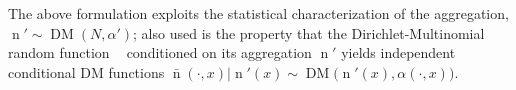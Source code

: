 \documentclass[12pt]{article}
\DeclareMathOperator{\xrm}{\mathrm{x}}
\DeclareMathOperator{\yrm}{\mathrm{y}}
\DeclareMathOperator{\nrm}{\mathrm{n}}
\DeclareMathOperator{\nbarrm}{\bar{\mathrm{n}}}
\DeclareMathOperator{\Prm}{\mathrm{P}}
\DeclareMathOperator{\Erm}{\mathrm{E}}
\DeclareMathOperator{\Xcal}{\mathcal{X}}
\DeclareMathOperator{\Ycal}{\mathcal{Y}}
\DeclareMathOperator{\Ncal}{\mathcal{N}}
\DeclareMathOperator{\DM}{\mathrm{DM}}
\begin{document}
The above formulation exploits the statistical characterization of the aggregation, $\nrm' \sim \DM(N,\alpha')$; also used is the property that the Dirichlet-Multinomial random function $\nbarrm$ conditioned on its aggregation $\nrm'$ yields independent  conditional DM functions $\bar{\nrm}(\cdot,x) | \nrm'(x) \sim \DM\big( \nrm'(x),\alpha(\cdot,x) \big)$.
\end{document}
